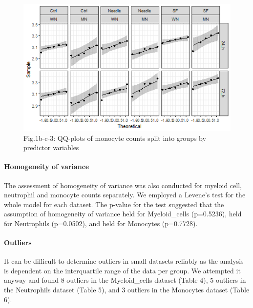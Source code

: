 \documentclass[
  12pt,
  letterpaper,
]{article}
\begin{document}
\begin{figure}[H]

{\centering \includegraphics[width=0.95\linewidth,]{Statistics_report_files/figure-latex/qq-plot-figure-1b-c-monocytes-1} 

}

\caption{Fig.1b-c-3: QQ-plots of monocyte counts split into groups by predictor variables}\label{fig:qq-plot-figure-1b-c-monocytes}
\end{figure}

\paragraph{Homogeneity of variance}\label{homogeneity-of-variance}

The assessment of homogeneity of variance was also conducted for myeloid cell, neutrophil and monocyte counts separately. We employed a Levene's test for the whole model for each dataset. The p-value for the test suggested that the assumption of homogeneity of variance held for Myeloid\_cells (p=0.5236), held for Neutrophils (p=0.0502), and held for Monocytes (p=0.7728).

\paragraph{Outliers}\label{outliers}

It can be difficult to determine outliers in small datasets reliably as the analysis is dependent on the interquartile range of the data per group. We attempted it anyway and found 8 outliers in the Myeloid\_cells dataset (Table 4), 5 outliers in the Neutrophils dataset (Table 5), and 3 outliers in the Monocytes dataset (Table 6).
\end{document}
